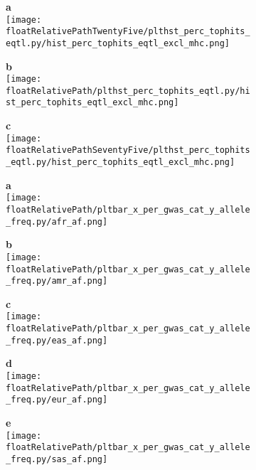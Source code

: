 \begin{figure}[!tbp]

\begin{subfigure}[]{.32\textwidth}
\textbf{a}
\\
\texttt{[image: \\floatRelativePathTwentyFive/plthst\_perc\_tophits\_eqtl.py/hist\_perc\_tophits\_eqtl\_excl\_mhc.png]}
\end{subfigure}
%
\begin{subfigure}[]{.32\textwidth}
\textbf{b}
\\
\texttt{[image: \\floatRelativePath/plthst\_perc\_tophits\_eqtl.py/hist\_perc\_tophits\_eqtl\_excl\_mhc.png]}
\end{subfigure}
%
\begin{subfigure}[]{.32\textwidth}
\textbf{c}
\\
\texttt{[image: \\floatRelativePathSeventyFive/plthst\_perc\_tophits\_eqtl.py/hist\_perc\_tophits\_eqtl\_excl\_mhc.png]}
\end{subfigure}

\end{figure}

%
%

\begin{figure}[!tbp]

\begin{subfigure}[]{.32\textwidth}
\textbf{a}
\\
\texttt{[image: \\floatRelativePath/pltbar\_x\_per\_gwas\_cat\_y\_allele\_freq.py/afr\_af.png]}
\end{subfigure}
%
\begin{subfigure}[]{.32\textwidth}
\textbf{b}
\\
\texttt{[image: \\floatRelativePath/pltbar\_x\_per\_gwas\_cat\_y\_allele\_freq.py/amr\_af.png]}
\end{subfigure}
%
\begin{subfigure}[]{.32\textwidth}
\textbf{c}
\\
\texttt{[image: \\floatRelativePath/pltbar\_x\_per\_gwas\_cat\_y\_allele\_freq.py/eas\_af.png]}
\end{subfigure}

\begin{subfigure}[]{.32\textwidth}
\textbf{d}
\\
\texttt{[image: \\floatRelativePath/pltbar\_x\_per\_gwas\_cat\_y\_allele\_freq.py/eur\_af.png]}
\end{subfigure}
%
\begin{subfigure}[]{.32\textwidth}
\textbf{e}
\\
\texttt{[image: \\floatRelativePath/pltbar\_x\_per\_gwas\_cat\_y\_allele\_freq.py/sas\_af.png]}
\end{subfigure}

\end{figure}
